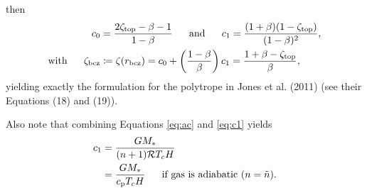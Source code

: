 \documentclass[12pt]{article}
\numberwithin{equation}{section}
\begin{document}
then 
\begin{subequations}
\begin{align}
c_0 &= \frac{2\zeta_{\rm{top}} - \beta - 1}{1-\beta} \ \ \ \ \ \text{and}\ \ \ \ \  c_1 = \frac{(1+\beta)(1-\zeta_{\rm{top}})}{(1-\beta)^2},\\
\text{with}\ \ \ \ \  \zeta_{\rm{bcz}}   &\coloneqq      \zeta(r_{\rm{bcz}}) = c_0+\left(\frac{1-\beta}{\beta}\right)c_1 = \frac{1+\beta - \zeta_{\rm{top}}}{\beta},
\label{eq:c01_from_zeta0}
\end{align}
\end{subequations}
yielding exactly the formulation for the polytrope in Jones et al. (2011) (see their Equations (18) and (19)). 

Also note that combining Equations \eqref{eq:ac} and \eqref{eq:c1} yields
\begin{subequations}
\begin{align}
	c_1&=\frac{GM_*}{(n+1)\mathcal{R} T_cH}\\
	&= \frac{GM_*}{c_{\rm{p}} T_cH}\ \ \ \ \ \text{if gas is adiabatic $(n=\tilde{n})$}.
\end{align}
\end{subequations}
\end{document}
